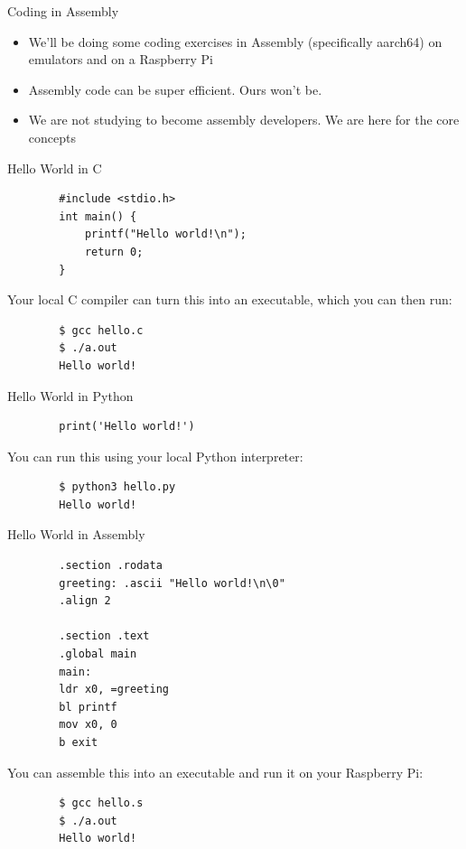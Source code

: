 
\begin{frame}{Coding in Assembly}
	\begin{itemize}
		\item We'll be doing some coding exercises in Assembly (specifically aarch64) on emulators and on a Raspberry Pi
		\item Assembly code can be super efficient. Ours won't be.
		\item We are not studying to become assembly developers. We are here for the core concepts
	\end{itemize}
\end{frame}

\begin{frame}[fragile]{Hello World in C}
	\begin{verbatim}
		#include <stdio.h>
		int main() {
			printf("Hello world!\n");
			return 0;
		}
	\end{verbatim}

	Your local C compiler can turn this into an executable, which you can then run:

	\begin{verbatim}
		$ gcc hello.c
		$ ./a.out
		Hello world!
	\end{verbatim}
\end{frame}


\begin{frame}[fragile]{Hello World in Python}
	\begin{verbatim}
		print('Hello world!')
	\end{verbatim}

	You can run this using your local Python interpreter:
	\begin{verbatim}
		$ python3 hello.py
		Hello world!
	\end{verbatim}
\end{frame}

\begin{frame}[fragile]{Hello World in Assembly}
	\begin{verbatim}
		.section .rodata
		greeting: .ascii "Hello world!\n\0"
		.align 2

		.section .text
		.global main
		main:
		ldr x0, =greeting
		bl printf
		mov x0, 0
		b exit
	\end{verbatim}

	You can assemble this into an executable and run it on your Raspberry Pi:
	\begin{verbatim}
		$ gcc hello.s
		$ ./a.out
		Hello world!
	\end{verbatim}
\end{frame}

